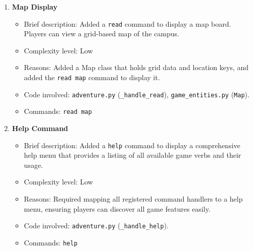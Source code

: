 \documentclass[11pt]{article}
\begin{document}
\begin{enumerate}
    \item \textbf{Map Display}
    \begin{itemize}
        \item Brief description: Added a \texttt{read} command to display a map board. Players can view a grid-based map of the campus.
        \item Complexity level: Low
        \item Reasons: Added a Map class that holds grid data and location keys, and added the \texttt{read map} command to display it.
        \item Code involved: \texttt{adventure.py} (\texttt{\_handle\_read}), \texttt{game\_entities.py} (\texttt{Map}).
        \item Commands: \texttt{read map}
    \end{itemize}
    
    \item \textbf{Help Command}
    \begin{itemize}
        \item Brief description: Added a \texttt{help} command to display a comprehensive help menu that provides a listing of all available game verbs and their usage.
        \item Complexity level: Low
        \item Reasons: Required mapping all registered command handlers to a help menu, ensuring players can discover all game features easily.
        \item Code involved: \texttt{adventure.py} (\texttt{\_handle\_help}).
        \item Commands: \texttt{help}
    \end{itemize}
\end{enumerate}
\end{document}
